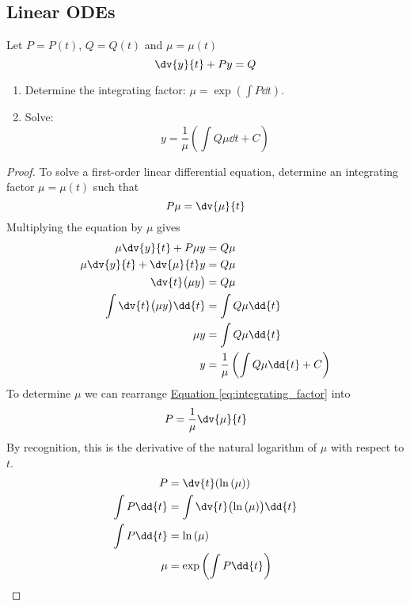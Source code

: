\documentclass{article}
\begin{document}
\subsection{Linear ODEs}
Let $P=P(t)$, $Q=Q(t)$ and $\mu = \mu(t)$
\begin{equation*}
    \dv{y}{t} + Py = Q
\end{equation*}
\begin{enumerate}
    \item Determine the integrating factor: $\displaystyle \mu=\exp{\left( \int P \dd{t} \right)}$.
    \item Solve:
          \begin{equation*}
              y=\frac{1}{\mu}\left(\int Q \mu \dd{t} + C\right)
          \end{equation*}
\end{enumerate}
\begin{proof}
    To solve a first-order linear differential equation, determine an integrating factor $\mu = \mu(t)$ such that
    \begin{equation}
        P \mu = \dv{\mu}{t} \label{eq:integrating_factor}
    \end{equation}
    Multiplying the equation by $\mu$ gives
    \begin{align*}
        \mu \dv{y}{t} + P \mu y             & = Q \mu                                           \\
        \mu \dv{y}{t} + \dv{\mu}{t} y       & = Q \mu                                           \\
        \dv{t}\bigl(\mu y\bigr)             & = Q \mu                                           \\
        \int \dv{t}\bigl(\mu y\bigr) \dd{t} & = \int Q \mu \dd{t}                               \\
        \mu y                               & = \int Q \mu \dd{t}                               \\
        y                                   & = \frac{1}{\mu}\left(\int Q \mu \dd{t} + C\right)
    \end{align*}
    To determine $\mu$ we can rearrange \hyperref[eq:integrating_factor]{Equation \ref{eq:integrating_factor}} into
    \begin{align*}
        P = \frac{1}{\mu}\dv{\mu}{t}
    \end{align*}
    By recognition, this is the derivative of the natural logarithm of $\mu$ with respect to $t$.
    \begin{align*}
        P             & = \dv{t}(\ln{\left( \mu \right)})                       \\
        \int P \dd{t} & = \int \dv{t}\bigl(\ln{\left( \mu \right)}\bigr) \dd{t} \\
        \int P \dd{t} & = \ln{\left( \mu \right)}                               \\
        \mu           & = \exp{\left( \int P \dd{t} \right)}
    \end{align*}
\end{proof}
\end{document}
